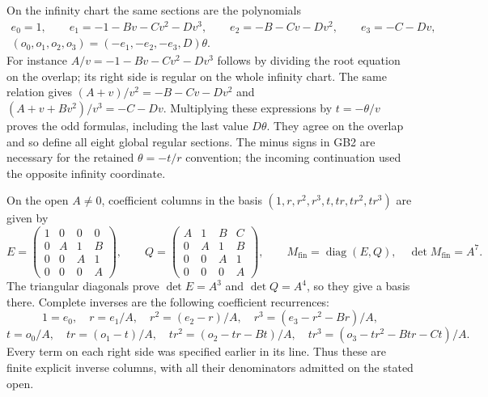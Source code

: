 \documentclass[11pt]{article}
\newcommand{\diag}{\operatorname{diag}}
\begin{document}
On the infinity chart the same sections are the polynomials
\begin{equation}
 \begin{gathered}
 e_0=1,\qquad e_1=-1-Bv-Cv^2-Dv^3,\qquad
 e_2=-B-Cv-Dv^2,\qquad e_3=-C-Dv,\\
 (o_0,o_1,o_2,o_3)=(-e_1,-e_2,-e_3,D)\theta.
 \end{gathered}
 \tag{GB2}
\end{equation}
For instance $A/v=-1-Bv-Cv^2-Dv^3$ follows by dividing
the root equation on the overlap; its right side is regular
on the whole infinity chart. The same relation gives
$(A+v)/v^2=-B-Cv-Dv^2$ and
$(A+v+Bv^2)/v^3=-C-Dv$.
Multiplying these expressions by $t=-\theta/v$ proves
the odd formulas, including the last value $D\theta$.
They agree on the overlap and so define all eight global
regular sections. The minus signs in GB2 are necessary
for the retained $\theta=-t/r$ convention; the incoming
continuation used the opposite infinity coordinate.

On the open $A\ne0$, coefficient columns in the basis
$(1,r,r^2,r^3,t,tr,tr^2,tr^3)$ are given by
\begin{equation}
 E=\begin{pmatrix}
 1&0&0&0\\0&A&1&B\\0&0&A&1\\0&0&0&A
 \end{pmatrix},\qquad
 Q=\begin{pmatrix}
 A&1&B&C\\0&A&1&B\\0&0&A&1\\0&0&0&A
 \end{pmatrix},\qquad
 M_{\mathrm{fin}}=\diag(E,Q),\quad
 \det M_{\mathrm{fin}}=A^7.
 \tag{GB3}
\end{equation}
The triangular diagonals prove $\det E=A^3$ and
$\det Q=A^4$, so they give a basis there. Complete
inverses are the following coefficient recurrences:
\[
 1=e_0,\quad r=e_1/A,\quad
 r^2=(e_2-r)/A,\quad r^3=(e_3-r^2-Br)/A,
\]
\[
 t=o_0/A,\quad tr=(o_1-t)/A,\quad
 tr^2=(o_2-tr-Bt)/A,\quad
 tr^3=(o_3-tr^2-Btr-Ct)/A.
\]
Every term on each right side was specified earlier in its
line. Thus these are finite explicit inverse columns, with
all their denominators admitted on the stated open.
\end{document}
